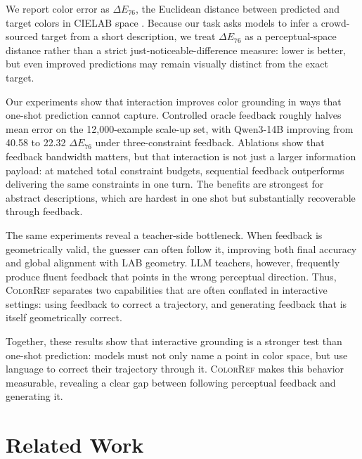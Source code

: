 \documentclass[11pt]{article}
\begin{document}
We report color error as $\Delta E_{76}$, the Euclidean distance between
predicted and target colors in CIELAB space \citep{colorimetry1986official}.
Because our task asks models to infer a crowd-sourced target from a short
description, we treat $\Delta E_{76}$ as a perceptual-space distance rather
than a strict just-noticeable-difference measure: lower is better, but even
improved predictions may remain visually distinct from the exact target.

Our experiments show that interaction improves color grounding in ways that
one-shot prediction cannot capture. Controlled oracle feedback roughly halves
mean error on the 12{,}000-example scale-up set, with Qwen3-14B improving
from 40.58 to 22.32 $\Delta E_{76}$ under three-constraint feedback.
Ablations show that feedback bandwidth matters, but that interaction is not
just a larger information payload: at matched total constraint budgets,
sequential feedback outperforms delivering the same constraints in one turn.
The benefits are strongest for abstract descriptions, which are hardest in
one shot but substantially recoverable through feedback.

The same experiments reveal a teacher-side bottleneck. When feedback is
geometrically valid, the guesser can often follow it, improving both final
accuracy and global alignment with LAB geometry. LLM teachers, however,
frequently produce fluent feedback that points in the wrong perceptual
direction. Thus, \textsc{ColorRef} separates two capabilities that are often
conflated in interactive settings: using feedback to correct a trajectory,
and generating feedback that is itself geometrically correct.

Together, these results show that interactive grounding is a stronger test
than one-shot prediction: models must not only name a point in color space,
but use language to correct their trajectory through it. \textsc{ColorRef}
makes this behavior measurable, revealing a clear gap between following
perceptual feedback and generating it.

\section{Related Work}
\label{sec:related_work}
\end{document}
